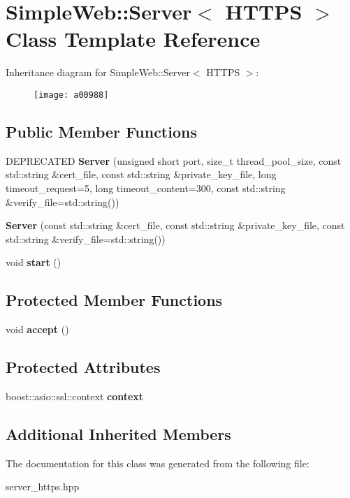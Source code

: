 \hypertarget{a00988}{}\section{Simple\+Web\+:\+:Server$<$ H\+T\+T\+PS $>$ Class Template Reference}
\label{a00988}
Inheritance diagram for Simple\+Web\+:\+:Server$<$ H\+T\+T\+PS $>$\+:\begin{figure}[H]
\begin{center}
\leavevmode
\texttt{[image: a00988]}
\end{center}
\end{figure}
\subsection*{Public Member Functions}
\begin{DoxyCompactItemize}
\item 
\mbox{\label{a00988_a1a5530e96cd973de3dc987034ca61b54}} 
D\+E\+P\+R\+E\+C\+A\+T\+ED {\bfseries Server} (unsigned short port, size\+\_\+t thread\+\_\+pool\+\_\+size, const std\+::string \&cert\+\_\+file, const std\+::string \&private\+\_\+key\+\_\+file, long timeout\+\_\+request=5, long timeout\+\_\+content=300, const std\+::string \&verify\+\_\+file=std\+::string())
\item 
\mbox{\label{a00988_a15bb179287dfaa18da16b8877174e8d6}} 
{\bfseries Server} (const std\+::string \&cert\+\_\+file, const std\+::string \&private\+\_\+key\+\_\+file, const std\+::string \&verify\+\_\+file=std\+::string())
\item 
\mbox{\label{a00988_a6a740b3fdbbbf178f540e27942cc93fc}} 
void {\bfseries start} ()
\end{DoxyCompactItemize}
\subsection*{Protected Member Functions}
\begin{DoxyCompactItemize}
\item 
\mbox{\label{a00988_af722d2884eafafada7073feb7793c422}} 
void {\bfseries accept} ()
\end{DoxyCompactItemize}
\subsection*{Protected Attributes}
\begin{DoxyCompactItemize}
\item 
\mbox{\label{a00988_ade0b1e6f826fd76ba6c6253d352fd93c}} 
boost\+::asio\+::ssl\+::context {\bfseries context}
\end{DoxyCompactItemize}
\subsection*{Additional Inherited Members}


The documentation for this class was generated from the following file\+:\begin{DoxyCompactItemize}
\item 
server\+\_\+https.\+hpp\end{DoxyCompactItemize}
